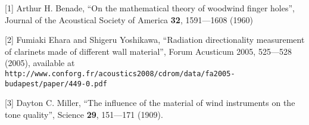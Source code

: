 


  \sectionreferences{}[1] Arthur H. Benade, “On the mathematical theory of 
  woodwind finger holes”, Journal of the Acoustical Society of America 
  \textbf{32}, 1591—1608 (1960) 

  [2] Fumiaki Ehara and Shigeru Yoshikawa, “Radiation directionality 
  measurement of clarinets made of different wall material”, Forum Acusticum 
  2005, 525—528 (2005), available at 
  \tt{}http://www.conforg.fr/acoustics2008/cdrom/data/fa2005-budapest/paper/449-0.pdf\rm{} 

  [3] Dayton C. Miller, “The influence of the material of wind instruments on 
  the tone quality”, Science \textbf{29}, 151—171 (1909). 